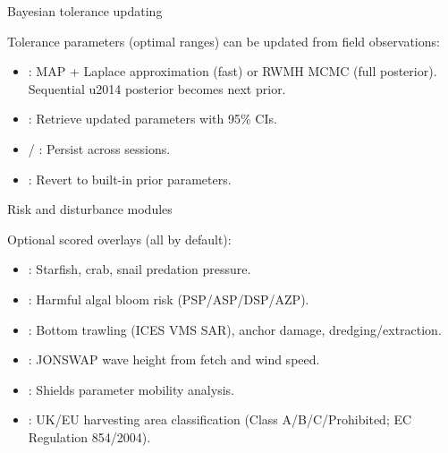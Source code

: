 \documentclass[a4paper]{book}
\begin{document}
%
\begin{Section}{Bayesian tolerance updating}

Tolerance parameters (optimal ranges) can be updated from field observations:
\begin{itemize}

\item{} : MAP + Laplace approximation (fast) or
RWMH MCMC (full posterior). Sequential \bsl{}u2014 posterior becomes next prior.
\item{} : Retrieve updated parameters with 95\% CIs.
\item{}  / : Persist across sessions.
\item{} : Revert to built-in prior parameters.

\end{itemize}

\end{Section}
%
\begin{Section}{Risk and disturbance modules}

Optional scored overlays (all  by default):
\begin{itemize}

\item{} : Starfish, crab, snail predation pressure.
\item{} : Harmful algal bloom risk (PSP/ASP/DSP/AZP).
\item{} : Bottom trawling (ICES VMS SAR),
anchor damage, dredging/extraction.
\item{} : JONSWAP wave height from fetch and wind speed.
\item{} : Shields parameter mobility analysis.
\item{} : UK/EU harvesting area classification
(Class A/B/C/Prohibited; EC Regulation 854/2004).

\end{itemize}

\end{Section}
\end{document}
